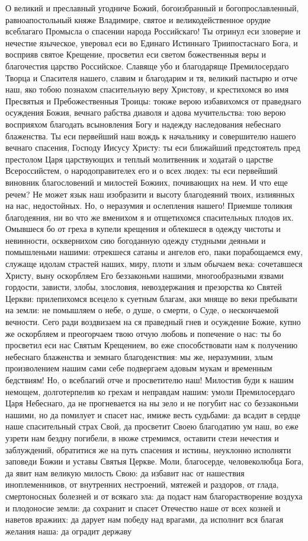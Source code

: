 \begin{mymulticols}
О великий и преславный угодниче Божий, богоизбранный и богопрославленный, равноапостольный княже Владимире, святое и великодейственное орудие всеблагаго Промысла о спасении народа Российскаго! Ты отринул еси зловерие и нечестие языческое, уверовал еси во Единаго Истиннаго Триипостаснаго Бога, и восприяв святое Крещение, просветил еси светом божественныя веры и благочестия царство Российское. Славяще убо и благодаряще Премилосердаго Творца и Спасителя нашего, славим и благодарим и тя, великий пастырю и отче наш, яко тобою познахом спасительную веру Христову, и крестихомся во имя Пресвятыя и Пребожественныя Троицы: тоюже верою избавихомся от праведнаго осуждения Божия, вечнаго рабства диаволя и адова мучительства: тою верою восприяхом благодать всыновления Богу и надежду наследования небеснаго блаженства. Ты еси первейший наш вождь к начальнику и совершителю нашего вечнаго спасения, Господу Иисусу Христу: ты еси ближайший предстоятель пред престолом Царя царствующих и теплый молитвенник и ходатай о царстве Всероссийстем, о народоправителех его и о всех людех: ты еси первейший виновник благословений и милостей Божиих, почивающих на нем. И что еще речем? Не может язык наш изобразити и высоту благодеяний твоих, излиянных на нас, недостойных. Но, о неразумия и ослепления нашего! Приемше толикия благодеяния, ни во что же вменихом я и отщетихомся спасительных плодов их. Омывшеся бо от греха в купели крещения и облекшеся в одежду чистоты и невинности, осквернихом сию богоданную одежду студными деяньми и помышленьми нашими: отрекшеся сатаны и ангелов его, паки порабощаемся ему, служаще идолам страстей наших, миру, плоти и злым обычаем века: сочетавшеся Христу, выну оскорбляем Его беззаконьми нашими, многообразными язвами гордости, зависти, злобы, злословия, невоздержания и презорства ко Святей Церкви: прилепихомся всецело к суетным благам, аки мняще во веки пребывати на земли: не помышляем о небе, о душе, о смерти, о Суде, о нескончаемой вечности. Сего ради воздвизаем на ся праведный гнев и осуждение Божие, купно же оскорбляем и преогорчаем твою отчую любовь и попечение о нас: ты бо просветил еси нас Святым Крещением, во еже способствовати нам к получению небеснаго блаженства и земнаго благоденствия: мы же, неразумнии, злым произволением нашим сами себе подвергаем адовым мукам и временным бедствиям! Но, о всеблагий отче и просветителю наш! Милостив буди к нашим немощем, долготерпелив ко грехам и неправдам нашим: умоли Премилосердаго Царя Небеснаго, да не прогневается на ны зело и не погубит нас со беззаконьми нашими, но да помилует и спасет нас, имиже весть судьбами: да всадит в сердце наше спасительный страх Свой, да просветит Своею благодатию ум наш, во еже узрети нам бездну погибели, в нюже стремимся, оставити стези нечестия и заблуждений, обратитися же на путь спасения и истины, неуклонно исполняти заповеди Божии и уставы Святыя Церкве. Моли, благосерде, человеколюбца Бога, да явит нам великую милость Свою: да избавит нас от нашествия иноплеменников, от внутренних нестроений, мятежей и раздоров, от глада, смертоносных болезней и от всякаго зла: да подаст нам благорастворение воздуха и плодоносие земли: да сохранит и спасет Отечество наше от всех козней и наветов вражиих: да дарует нам победу над врагами, да исполнит вся благая желания наша: да оградит державу 
\end{mymulticols}
